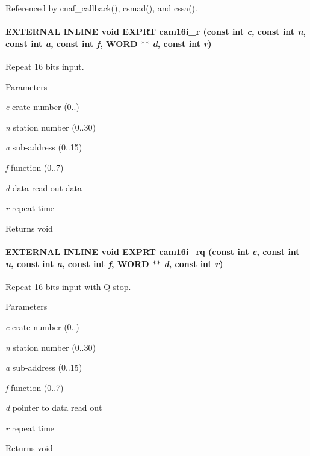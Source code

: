 Referenced by cnaf\_\-callback(), csmad(), and cssa().
\paragraph[{cam16i\_\-r}]{\setlength{\rightskip}{0pt plus 5cm}EXTERNAL INLINE void EXPRT cam16i\_\-r (const int {\em c}, \/  const int {\em n}, \/  const int {\em a}, \/  const int {\em f}, \/  {\bf WORD} $\ast$$\ast$ {\em d}, \/  const int {\em r})}\hfill\label{group__mcstdfunctionh_ga2c3c3cdd300fee9d03e3c426dad38e7c}
Repeat 16 bits input. 
\begin{DoxyParams}{Parameters}
\item[{\em c}]crate number (0..) \item[{\em n}]station number (0..30) \item[{\em a}]sub-\/address (0..15) \item[{\em f}]function (0..7) \item[{\em d}]data read out data \item[{\em r}]repeat time \end{DoxyParams}
\begin{DoxyReturn}{Returns}
void 
\end{DoxyReturn}
\paragraph[{cam16i\_\-rq}]{\setlength{\rightskip}{0pt plus 5cm}EXTERNAL INLINE void EXPRT cam16i\_\-rq (const int {\em c}, \/  const int {\em n}, \/  const int {\em a}, \/  const int {\em f}, \/  {\bf WORD} $\ast$$\ast$ {\em d}, \/  const int {\em r})}\hfill\label{group__mcstdfunctionh_ga4a234b702b8b906b0cca1bcbdb01ca27}
Repeat 16 bits input with Q stop. 
\begin{DoxyParams}{Parameters}
\item[{\em c}]crate number (0..) \item[{\em n}]station number (0..30) \item[{\em a}]sub-\/address (0..15) \item[{\em f}]function (0..7) \item[{\em d}]pointer to data read out \item[{\em r}]repeat time \end{DoxyParams}
\begin{DoxyReturn}{Returns}
void 
\end{DoxyReturn}


